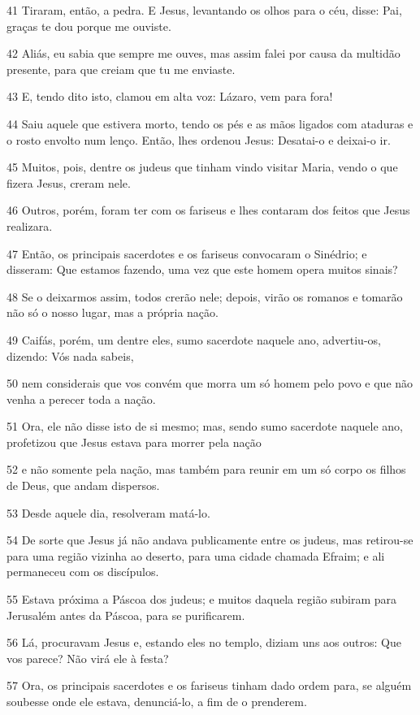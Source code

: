 \par 41 Tiraram, então, a pedra. E Jesus, levantando os olhos para o céu, disse: Pai, graças te dou porque me ouviste.
\par 42 Aliás, eu sabia que sempre me ouves, mas assim falei por causa da multidão presente, para que creiam que tu me enviaste.
\par 43 E, tendo dito isto, clamou em alta voz: Lázaro, vem para fora!
\par 44 Saiu aquele que estivera morto, tendo os pés e as mãos ligados com ataduras e o rosto envolto num lenço. Então, lhes ordenou Jesus: Desatai-o e deixai-o ir.
\par 45 Muitos, pois, dentre os judeus que tinham vindo visitar Maria, vendo o que fizera Jesus, creram nele.
\par 46 Outros, porém, foram ter com os fariseus e lhes contaram dos feitos que Jesus realizara.
\par 47 Então, os principais sacerdotes e os fariseus convocaram o Sinédrio; e disseram: Que estamos fazendo, uma vez que este homem opera muitos sinais?
\par 48 Se o deixarmos assim, todos crerão nele; depois, virão os romanos e tomarão não só o nosso lugar, mas a própria nação.
\par 49 Caifás, porém, um dentre eles, sumo sacerdote naquele ano, advertiu-os, dizendo: Vós nada sabeis,
\par 50 nem considerais que vos convém que morra um só homem pelo povo e que não venha a perecer toda a nação.
\par 51 Ora, ele não disse isto de si mesmo; mas, sendo sumo sacerdote naquele ano, profetizou que Jesus estava para morrer pela nação
\par 52 e não somente pela nação, mas também para reunir em um só corpo os filhos de Deus, que andam dispersos.
\par 53 Desde aquele dia, resolveram matá-lo.
\par 54 De sorte que Jesus já não andava publicamente entre os judeus, mas retirou-se para uma região vizinha ao deserto, para uma cidade chamada Efraim; e ali permaneceu com os discípulos.
\par 55 Estava próxima a Páscoa dos judeus; e muitos daquela região subiram para Jerusalém antes da Páscoa, para se purificarem.
\par 56 Lá, procuravam Jesus e, estando eles no templo, diziam uns aos outros: Que vos parece? Não virá ele à festa?
\par 57 Ora, os principais sacerdotes e os fariseus tinham dado ordem para, se alguém soubesse onde ele estava, denunciá-lo, a fim de o prenderem.

